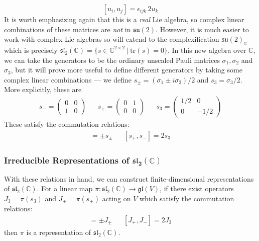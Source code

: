\documentclass[onecolumn]{gwclass}
\renewcommand{\t}[1]{\text{#1}}
\begin{document}
$$ [u_i, u_j] = \epsilon_{ijk}\,2u_k $$
It is worth emphasizing again that this is a \emph{real} Lie algebra, so complex linear combinations of these matrices are \emph{not} in $\mathfrak{su}(2)$. However, it is much easier to work with complex Lie algebras so will extend to the complexification $\mathfrak{su}(2)_\mathbb{C}$ which is precisely $\mathfrak{sl}_2(\mathbb{C}) = \{s\in\mathbb{C}^{2\times 2}\:|\: \t{tr}(s)=0\}$. In this new algebra over $\mathbb{C}$, we can take the generators to be the ordinary unscaled Pauli matrices $\sigma_1, \sigma_2$ and $\sigma_3$, but it will prove more useful to define different generators by taking some complex linear combinations --- we define $s_\pm = (\sigma_1 \pm i\sigma_2)/2 $ and $ s_3 = \sigma_3/2$. More explicitly, these are \begin{align*}
	s_-=\begin{pmatrix}0&0\\1&0\end{pmatrix} && s_+=\begin{pmatrix}0&1\\0&0\end{pmatrix} && s_3=\begin{pmatrix}1/2&0\\0&-1/2\end{pmatrix}
\end{align*} 
These satisfy the commutation relations:
\begin{align*}
	[s_3, s_\pm] = \pm s_\pm  && [s_+, s_-] = 2s_3
\end{align*}

\subsubsection{Irreducible Representations of $\boldsymbol{\mathfrak{sl}_2(\mathbb{C})}$}
With these relations in hand, we can construct finite-dimensional representations of $\mathfrak{sl}_2(\mathbb{C})$. For a linear map $\pi:\mathfrak{sl}_2(\mathbb{C})\to\mathfrak{gl}(V)$, if there exist operators $J_3=\pi(s_3)$ and $J_\pm=\pi(s_\pm)$ acting on $V$ which satisfy the commutation relations:
\begin{align*}
	[J_3, J_\pm] = \pm J_\pm && [J_+, J_-] = 2J_3
\end{align*}
then $\pi$ is a representation of $\mathfrak{sl}_2(\mathbb{C})$.
\end{document}
